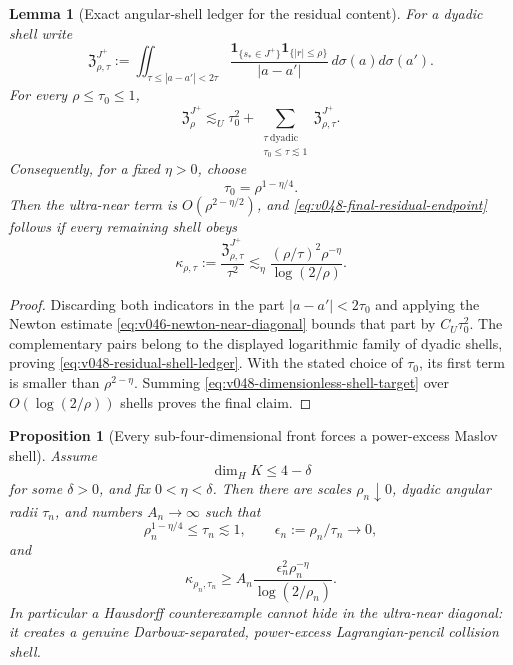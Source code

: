 \documentclass[10pt]{article}
\newtheorem{proposition}[theorem]{Proposition}
\newtheorem{lemma}[theorem]{Lemma}
\begin{document}
\begin{lemma}[Exact angular-shell ledger for the residual content]
\label{lem:v048-residual-shell-ledger}
For a dyadic shell write
\[
\mathfrak Z_{\rho,\tau}^{J^+}
:=
\iint_{\tau\le|a-a'|<2\tau}
\frac{
\mathbf 1_{\{s_*\in J^+\}}
\mathbf 1_{\{|r|\le\rho\}}
}{|a-a'|}
\,d\sigma(a)d\sigma(a').
\]
For every \(\rho\le\tau_0\le1\),
\begin{equation}
\label{eq:v048-residual-shell-ledger}
\boxed{
\mathfrak Z_\rho^{J^+}
\lesssim_U
\tau_0^2
+
\sum_{\substack{\tau\ \mathrm{dyadic}\\\tau_0\le\tau\lesssim1}}
\mathfrak Z_{\rho,\tau}^{J^+}.
}
\end{equation}
Consequently, for a fixed \(\eta>0\), choose
\[
\tau_0=\rho^{1-\eta/4}.
\]
Then the ultra-near term is \(O(\rho^{2-\eta/2})\), and
\eqref{eq:v048-final-residual-endpoint} follows if every remaining shell obeys
\begin{equation}
\label{eq:v048-dimensionless-shell-target}
\boxed{
\kappa_{\rho,\tau}
:=
\frac{\mathfrak Z_{\rho,\tau}^{J^+}}{\tau^2}
\lesssim_\eta
\frac{(\rho/\tau)^2\rho^{-\eta}}{\log(2/\rho)}.
}
\end{equation}
\end{lemma}

\begin{proof}
Discarding both indicators in the part \(|a-a'|<2\tau_0\) and applying the Newton estimate
\eqref{eq:v046-newton-near-diagonal} bounds that part by \(C_U\tau_0^2\).  The complementary pairs
belong to the displayed logarithmic family of dyadic shells, proving
\eqref{eq:v048-residual-shell-ledger}.  With the stated choice of \(\tau_0\), its first term is
smaller than \(\rho^{2-\eta}\).  Summing
\eqref{eq:v048-dimensionless-shell-target} over \(O(\log(2/\rho))\) shells proves the final claim.
\end{proof}

\begin{proposition}[Every sub-four-dimensional front forces a power-excess Maslov shell]
\label{prop:v048-counterexample-forces-shell}
Assume
\[
\dim_HK\le4-\delta
\]
for some \(\delta>0\), and fix \(0<\eta<\delta\).  Then there are scales
\(\rho_n\downarrow0\), dyadic angular radii \(\tau_n\), and numbers \(A_n\to\infty\) such that
\begin{equation}
\label{eq:v048-counterexample-shell-range}
\rho_n^{1-\eta/4}
\le
\tau_n
\lesssim1,
\qquad
\epsilon_n:=\rho_n/\tau_n\longrightarrow0,
\end{equation}
and
\begin{equation}
\label{eq:v048-counterexample-shell-excess}
\boxed{
\kappa_{\rho_n,\tau_n}
\ge
A_n
\frac{\epsilon_n^2\rho_n^{-\eta}}{\log(2/\rho_n)}.
}
\end{equation}
In particular a Hausdorff counterexample cannot hide in the ultra-near diagonal: it creates a
genuine Darboux-separated, power-excess Lagrangian-pencil collision shell.
\end{proposition}
\end{document}
